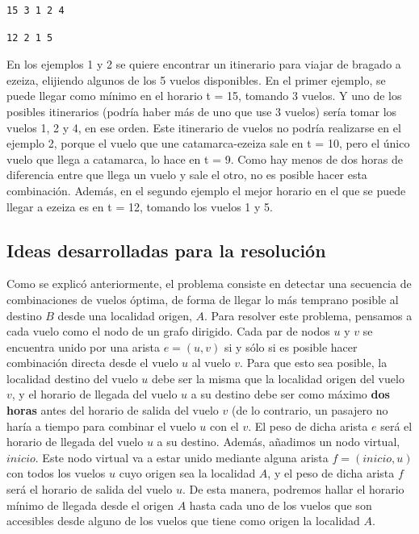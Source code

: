 \documentclass[11pt, a4paper, twoside]{article}
\begin{document}
\begin{minipage}[t]{0.4\textwidth}
\begin{Verbatim}[frame=single,framesep=1cm,label= Salida para instancia 1]
15 3 1 2 4
\end{Verbatim}
\end{minipage}
\hfill
\begin{minipage}[t]{0.4\textwidth}
\begin{Verbatim}[frame=single,framesep=1cm,label= Salida para instancia 2]
12 2 1 5
\end{Verbatim}
\end{minipage}

En los ejemplos 1 y 2 se quiere encontrar un itinerario para viajar de bragado a 
ezeiza, elijiendo algunos de los 5 vuelos disponibles. En el primer ejemplo, se 
puede llegar como mínimo en el horario t = 15, tomando 3 vuelos. Y uno de los
posibles itinerarios (podría haber más de uno que use 3 vuelos) sería tomar los 
vuelos 1, 2 y 4, en ese orden. Este itinerario de vuelos no podría realizarse en
el ejemplo 2, porque el vuelo que une catamarca-ezeiza sale en t = 10, pero el 
único vuelo que llega a catamarca, lo hace en t = 9. Como hay menos de dos horas
de diferencia entre que llega un vuelo y sale el otro, no es posible hacer esta 
combinación. Además, en el segundo ejemplo el mejor horario en el que se puede 
llegar a ezeiza es en t = 12, tomando los vuelos 1 y 5. \\

\subsection{Ideas desarrolladas para la resolución}
Como se explicó anteriormente, el problema consiste en detectar una secuencia de 
combinaciones de vuelos óptima, de forma de llegar lo más temprano posible al destino $B$
desde una localidad origen, $A$.
Para resolver este problema, pensamos a cada vuelo como el nodo de un grafo dirigido.
Cada par de nodos $u$ y $v$ se encuentra unido por una arista $e = (u,v)$ si y sólo si 
es posible hacer combinación directa desde el vuelo $u$ al vuelo $v$. Para que esto sea 
posible, la localidad destino del vuelo $u$ debe ser la misma que la localidad origen
del vuelo $v$, y el horario de llegada del vuelo $u$ a su destino debe ser como máximo 
\textbf{dos horas} antes del horario de salida del vuelo $v$ (de lo contrario, un pasajero
no haría a tiempo para combinar el vuelo $u$ con el $v$. El peso de dicha arista $e$ será
el horario de llegada del vuelo $u$ a su destino.
Además, añadimos un nodo virtual, 
$inicio$. Este nodo virtual va a estar unido mediante alguna arista $f = (inicio,u) $ con
todos los vuelos $u$ cuyo origen sea la localidad $A$, y el peso de dicha arista $f$ será 
el horario de salida del vuelo $u$. De esta manera, podremos hallar el horario mínimo de llegada
desde el origen $A$ hasta cada uno de los vuelos que son accesibles desde alguno de los vuelos 
que tiene como origen la localidad $A$.
\end{document}
